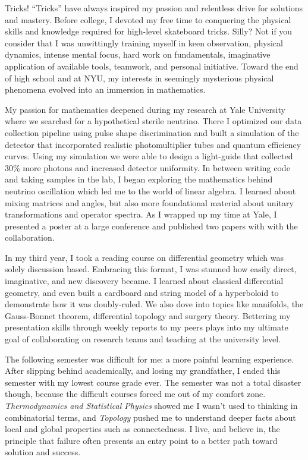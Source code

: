 \documentclass[11pt]{article}
\begin{document}
Tricks! ``Tricks'' have always inspired my passion and relentless drive for solutions and mastery. Before college, I devoted my free time to conquering the physical skills and knowledge required for high-level skateboard tricks. Silly? Not if you consider that I was unwittingly training myself in keen observation, physical dynamics, intense mental focus, hard work on fundamentals, imaginative application of available tools, teamwork, and personal initiative. Toward the end of high school and at NYU, my interests in seemingly mysterious physical phenomena evolved into an immersion in mathematics.

My passion for mathematics deepened during my research at Yale University where we searched for a hypothetical sterile neutrino. There I optimized our data collection pipeline using pulse shape discrimination and built a simulation of the detector that incorporated realistic photomultiplier tubes and quantum efficiency curves. Using my simulation we were able to design a light-guide that collected 30\% more photons and increased detector uniformity. In between writing code and taking samples in the lab, I began exploring the mathematics behind neutrino oscillation which led me to the world of linear algebra. I learned about mixing matrices and angles, but also more foundational material about unitary transformations and operator spectra. As I wrapped up my time at Yale, I presented a poster at a large conference and published two papers with with the collaboration.

In my third year, I took a reading course on differential geometry which was solely discussion based. Embracing this format, I was stunned how easily direct, imaginative, and new discovery became. I learned about classical differential geometry, and even built a cardboard and string model of a hyperboloid to demonstrate how it was doubly-ruled. We also dove into topics like manifolds, the Gauss-Bonnet theorem, differential topology and surgery theory. Bettering my presentation skills through weekly reports to my peers plays into my ultimate goal of collaborating on research teams and teaching at the university level.

The following semester was difficult for me: a more painful learning experience. After slipping behind academically, and losing my grandfather, I ended this semester with my lowest course grade ever. The semester was not a total disaster though, because the difficult courses forced me out of my comfort zone. \textit{Thermodynamics and Statistical Physics} showed me I wasn't used to thinking in combinatorial terms, and \textit{Topology} pushed me to understand deeper facts about local and global properties such as connectedness. I live, and believe in, the principle that failure often presents an entry point to a better path toward solution and success.
\end{document}
